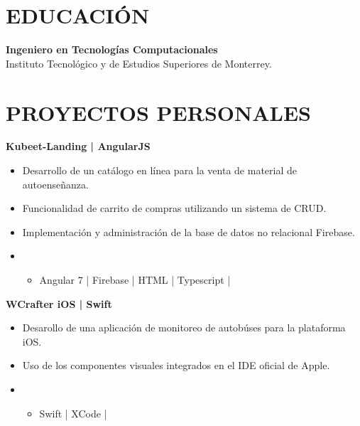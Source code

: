 \documentclass{res}
\begin{document}
\address{
}

\begin{resume}
    \separator

    \section{\large{EDUCACIÓN}} 
    \textbf{Ingeniero en Tecnologías Computacionales} 
     \\
    Instituto Tecnológico y de Estudios Superiores de Monterrey.
    
    \longjump

    \section{\large{PROYECTOS PERSONALES}} 
    \textbf{Kubeet-Landing | AngularJS} 
    \begin{itemize}
        \item Desarrollo de un catálogo en línea para la venta de material de autoenseñanza.
        \item Funcionalidad de carrito de compras utilizando un sistema de CRUD.
        \item Implementación y administración de la base de datos no relacional Firebase.
        \item {}
        \begin{itemize}
            \item Angular 7 | Firebase | HTML | Typescript |
        \end{itemize}
    \end{itemize}

    \textbf{WCrafter iOS | Swift} 
    \begin{itemize}
        \item Desarollo de una aplicación de monitoreo de autobúses para la plataforma iOS.
        \item Uso de los componentes visuales integrados en el IDE oficial de Apple.
        \item {}
        \begin{itemize}
            \item Swift | XCode |
        \end{itemize}
    \end{itemize}


\end{resume}
\end{document}
